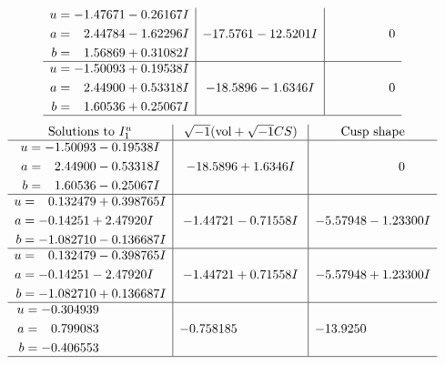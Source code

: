 \documentclass[1p]{elsarticle_modified}
\theoremstyle{definition}
\newcommand{\I}{\sqrt{-1}}
\begin{document}
$$\begin{array}{c|c|c}
\begin{aligned}
u &= -1.47671 - 0.26167 I \\
a &= \phantom{-}2.44784 - 1.62296 I \\
b &= \phantom{-}1.56869 + 0.31082 I\end{aligned}
 & -17.5761 - 12.5201 I & \phantom{-0.000000 } 0 \\ \hline\begin{aligned}
u &= -1.50093 + 0.19538 I \\
a &= \phantom{-}2.44900 + 0.53318 I \\
b &= \phantom{-}1.60536 + 0.25067 I\end{aligned}
 & -18.5896 - 1.6346 I & \phantom{-0.000000 } 0\\
 \hline 
 \end{array}$$\newpage$$\begin{array}{c|c|c}  
\text{Solutions to }I^u_{1}& \I (\text{vol} + \sqrt{-1}CS) & \text{Cusp shape}\\
 \hline 
\begin{aligned}
u &= -1.50093 - 0.19538 I \\
a &= \phantom{-}2.44900 - 0.53318 I \\
b &= \phantom{-}1.60536 - 0.25067 I\end{aligned}
 & -18.5896 + 1.6346 I & \phantom{-0.000000 } 0 \\ \hline\begin{aligned}
u &= \phantom{-}0.132479 + 0.398765 I \\
a &= -0.14251 + 2.47920 I \\
b &= -1.082710 - 0.136687 I\end{aligned}
 & -1.44721 - 0.71558 I & -5.57948 - 1.23300 I \\ \hline\begin{aligned}
u &= \phantom{-}0.132479 - 0.398765 I \\
a &= -0.14251 - 2.47920 I \\
b &= -1.082710 + 0.136687 I\end{aligned}
 & -1.44721 + 0.71558 I & -5.57948 + 1.23300 I \\ \hline\begin{aligned}
u &= -0.304939\phantom{ +0.000000I} \\
a &= \phantom{-}0.799083\phantom{ +0.000000I} \\
b &= -0.406553\phantom{ +0.000000I}\end{aligned}
 & -0.758185\phantom{ +0.000000I} & -13.9250\phantom{ +0.000000I}\\
 \hline 
 \end{array}$$\newpage\newpage\renewcommand{\arraystretch}{1}
\end{document}
